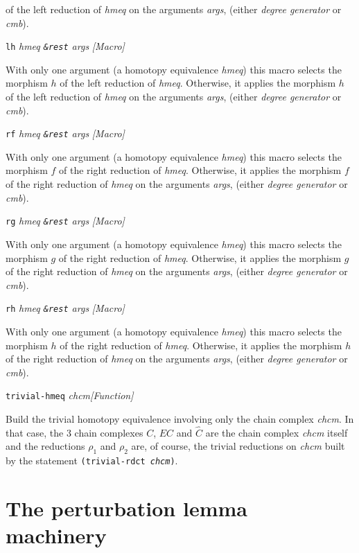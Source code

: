 {{of the left reduction of {\em hmeq} on the arguments {\em args},
(either {\em degree generator} or {\em cmb}).  \par}
{\leftskip=5mm
{\tt lh} {\em hmeq {\tt \&rest} args} \hfill {\em [Macro]} \par}
{\leftskip=15mm
With only one argument (a homotopy equivalence {\em hmeq}) this macro selects
the morphism $h$ of the left reduction of {\em hmeq}. Otherwise, it applies  the morphism $h$
of the left reduction of {\em hmeq} on the arguments {\em args},
(either {\em degree generator} or {\em cmb}).  \par}
{\leftskip=5mm
{\tt rf} {\em hmeq {\tt \&rest} args} \hfill {\em [Macro]} \par}
{\leftskip=15mm
With only one argument (a homotopy equivalence {\em hmeq}) this macro selects
the morphism $f$ of the right reduction of {\em hmeq}. Otherwise, it applies  the morphism $f$
of the right reduction of {\em hmeq} on the arguments {\em args},
(either {\em degree generator} or {\em cmb}).  \par}
{\leftskip=5mm
{\tt rg} {\em hmeq {\tt \&rest} args} \hfill {\em [Macro]} \par}
{\leftskip=15mm
With only one argument (a homotopy equivalence {\em hmeq}) this macro selects
the morphism $g$ of the right reduction of {\em hmeq}. Otherwise, it applies  the morphism $g$
of the right reduction of {\em hmeq} on the arguments {\em args},
(either {\em degree generator} or {\em cmb}).  \par}
{\leftskip=5mm
{\tt rh} {\em hmeq {\tt \&rest} args} \hfill {\em [Macro]} \par}
{\leftskip=15mm
With only one argument (a homotopy equivalence {\em hmeq}) this macro selects
the morphism $h$ of the right reduction of {\em hmeq}. Otherwise, it applies  the morphism $h$
of the right reduction of {\em hmeq} on the arguments {\em args},
(either {\em degree generator} or {\em cmb}).  \par}
{\leftskip=5mm
{\tt trivial-hmeq} {\em chcm}\hfill {\em [Function]} \par}
{\leftskip=15mm
Build the trivial homotopy equivalence involving only the chain complex {\em chcm}. In that case,
the $3$ chain complexes $C$, $EC$ and $\hat C$ are  the chain complex {\em chcm} itself and
the reductions $\rho_1$ and $\rho_2$ are, of course, the trivial reductions on {\em chcm} built
by the statement {\tt (trivial-rdct {\em chcm})}. \par}
}

\section {The perturbation lemma machinery}

